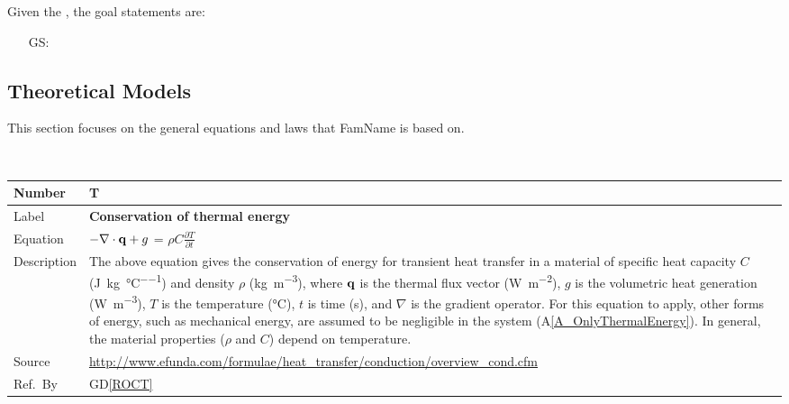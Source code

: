 \documentclass[12pt]{article}
\newcommand{\colAwidth}{0.13\textwidth}
\newcommand{\colBwidth}{0.82\textwidth}
\newcommand{\dref}[1]{GD\ref{#1}}
\newcounter{theorynum} %
\newcommand{\aref}[1]{A\ref{#1}}
\newcounter{goalnum} %
\newcommand{\famname}{FamName} %
\begin{document}
\noindent Given the , the goal statements are:

\begin{itemize}

	\item[GS\refstepcounter{goalnum}\thegoalnum \label{G_meaningfulLabel}:] 

\end{itemize}

\subsection{Theoretical Models} \label{sec_theoretical}

This section focuses on the general equations and laws that \famname{} is based on. 

~\newline

\noindent
\begin{minipage}{\textwidth}
	\renewcommand*{\arraystretch}{1.5}
	\begin{tabular}{| p{\colAwidth} | p{\colBwidth}|}
		\hline
		\rowcolor[gray]{0.9}
		Number   & T{theorynum}\thetheorynum \label{T_COE}               \\
		\hline
		Label    & \bf Conservation of thermal energy                                   \\
		\hline
		Equation & $-{\bf \nabla \cdot q} + g$ = $\rho C \frac{\partial T}{\partial t}$ \\ \hline Description & The above equation gives the conservation of energy for transient
		   heat transfer in a material of specific heat capacity $C$ (\si{\joule\per\kilogram\per\celsius})
		   and density $\rho$ (\si{\kilogram\per\cubic\metre}), where $\bf q$ is the thermal flux vector
		   (\si{\watt\per\square\metre}), $g$ is the volumetric heat generation (\si{\watt\per\cubic\metre}),
		   $T$ is the temperature (\si{\celsius}), $t$ is time (\si{\second}), and $\nabla$ is the gradient
		   operator. For this equation to apply, other forms of energy, such as mechanical energy, are assumed
		   to be negligible in the system (\aref{A_OnlyThermalEnergy}). In general, the material properties
		($\rho$ and $C$) depend on temperature.                                         \\ \hline Source &
		\url{http://www.efunda.com/formulae/heat_transfer/conduction/overview_cond.cfm} \\
		\hline
		Ref.\ By & \dref{ROCT}                                                          \\
		\hline
	\end{tabular}
\end{minipage}\\
\end{document}

